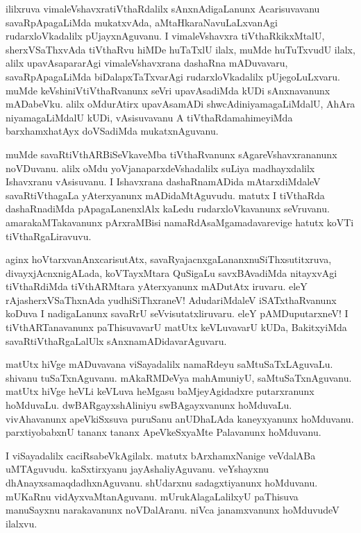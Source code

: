 \documentclass{article}
\begin{document}
\begin{mn}
ililxruva vimaleVshavxratiVthaRdalilx  sAnxnAdigaLanunx Acarisuvavanu savaRpApagaLiMda mukatxvAda, 
aMtaHkaraNavuLaLxvanAgi rudarxloVkadalilx pUjayxnAguvanu. I vimaleVshavxra tiVthaRkikxMtalU,
sherxVSaThxvAda tiVthaRvu hiMDe huTaTxlU ilalx, muMde huTuTxvudU ilalx, alilx upavAsapararAgi 
vimaleVshavxrana dashaRna mADuvavaru, savaRpApagaLiMda biDalapxTaTxvarAgi rudarxloVkadalilx 
pUjegoLuLxvaru. muMde keVshiniVtiVthaRvanunx seVri upavAsadiMda kUDi sAnxnavanunx mADabeVku. alilx 
oMdurAtirx upavAsamADi shwcAdiniyamagaLiMdalU, AhAra niyamagaLiMdalU kUDi, vAsisuvavanu A 
tiVthaRdamahimeyiMda barxhamxhatAyx doVSadiMda mukatxnAguvanu.
\end{mn}

\begin{mn}
muMde savaRtiVthARBiSeVkaveMba tiVthaRvanunx sAgareVshavxrananunx noVDuvanu. alilx oMdu 
yoVjanaparxdeVshadalilx suLiya madhayxdalilx Ishavxranu vAsisuvanu. I Ishavxrana dashaRnamADida 
mAtarxdiMdaleV savaRtiVthagaLa yAterxyanunx mADidaMtAguvudu. matutx I tiVthaRda dashaRnadiMda 
pApagaLanenxlAlx kaLedu rudarxloVkavanunx seVruvanu. amarakaMTakavanunx pArxraMBisi 
namaRdAsaMgamadavarevige hatutx koVTi tiVthaRgaLiravuvu.
\end{mn}

\begin{mn}
aginx hoVtarxvanAnxcarisutAtx, savaRyajacnxgaLananxnuSiThxsutitxruva, divayxjAcnxnigALada, 
koVTayxMtara QuSigaLu savxBAvadiMda nitayxvAgi tiVthaRdiMda tiVthARMtara yAterxyanunx mADutAtx 
iruvaru. eleY rAjasherxVSaThxnAda yudhiSiThxraneV! AdudariMdaleV iSATxthaRvanunx koDuva I 
nadigaLanunx savaRrU seVvisutatxliruvaru. eleY pAMDuputarxneV! I tiVthARTanavanunx paThisuvavarU 
matUtx keVLuvavarU kUDa, BakitxyiMda savaRtiVthaRgaLalUlx sAnxnamADidavarAguvaru.
\end{mn}

\begin{mn}
matUtx hiVge mADuvavana viSayadalilx namaRdeyu saMtuSaTxLAguvaLu. shivanu tuSaTxnAguvanu. 
mAkaRMDeVya mahAmuniyU, saMtuSaTxnAguvanu. matUtx hiVge heVLi keVLuva heMgasu baMjeyAgidadxre 
putarxranunx hoMduvaLu. dwBARgayxshAliniyu swBAgayxvanunx hoMduvaLu. vivAhavanunx apeVkiSxsuva 
puruSanu anUDhaLAda kaneyxyanunx hoMduvanu. parxtiyobabxnU tananx tananx ApeVkeSxyaMte Palavanunx
hoMduvanu.
\end{mn}

\begin{mn}
I viSayadalilx caciRsabeVkAgilalx. matutx bArxhamxNanige veVdalABa uMTAguvudu. kaSxtirxyanu 
jayAshaliyAguvanu. veYshayxnu dhAnayxsamaqdadhxnAguvanu. shUdarxnu sadagxtiyanunx hoMduvanu. mUKaRnu
vidAyxvaMtanAguvanu. mUrukAlagaLalilxyU paThisuva manuSayxnu narakavanunx noVDalAranu. niVca 
janamxvanunx hoMduvudeV ilalxvu.
\end{mn}
\end{document}
